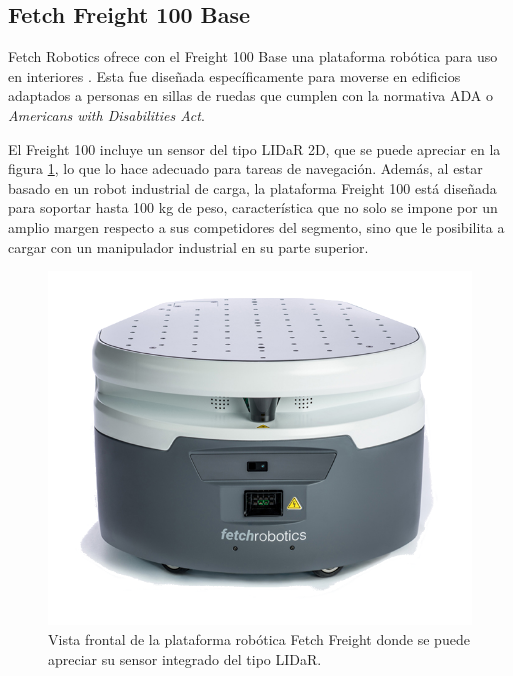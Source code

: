 \subsection{Fetch Freight 100 Base}

Fetch Robotics ofrece con el Freight 100 Base una plataforma robótica para uso en interiores \citep{PAPER:1}. Esta fue diseñada específicamente para moverse en edificios adaptados a personas en sillas de ruedas que cumplen con la normativa ADA o \textit{Americans with Disabilities Act}\citep{ACT:1}.

El Freight 100 incluye un sensor del tipo LIDaR 2D, que se puede apreciar en la figura \ref{fig:robotFreight}, lo que lo hace adecuado para tareas de navegación. Además, al estar basado en un robot industrial de carga, la plataforma Freight 100 está diseñada para soportar hasta 100 kg de peso, característica que no solo se impone por un amplio margen respecto a sus competidores del segmento, sino que le posibilita a cargar con un manipulador industrial en su parte superior.

\begin{figure}[ht]
	\centering
	\includegraphics[scale=1.0]{./Figures/freight.png}
	\caption{Vista frontal de la plataforma robótica Fetch Freight donde se puede apreciar su sensor integrado del tipo LIDaR.\protect\footnotemark}
	\label{fig:robotFreight}
\end{figure}



